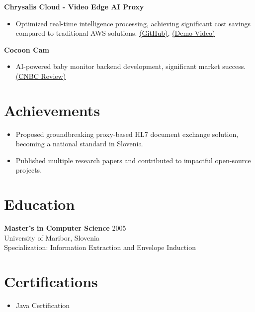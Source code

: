 \documentclass[11pt]{article}
\begin{document}
\textbf{Chrysalis Cloud - Video Edge AI Proxy}
\begin{itemize}
    \item Optimized real-time intelligence processing, achieving significant cost savings compared to traditional AWS solutions. \href{https://github.com/igorrendulic/video-edge-ai-proxy}{(GitHub)}, \href{https://www.youtube.com/watch?v=bWCgTW2Ar5s}{(Demo Video)}
\end{itemize}

\textbf{Cocoon Cam}
\begin{itemize}
    \item AI-powered baby monitor backend development, significant market success. \href{https://www.cnbc.com/2018/06/13/cocoon-cam-review-a-smart-baby-monitor-that-detects-breathing.html}{(CNBC Review)}
\end{itemize}

\section*{Achievements}
\begin{itemize}
    \item Proposed groundbreaking proxy-based HL7 document exchange solution, becoming a national standard in Slovenia.
    \item Published multiple research papers and contributed to impactful open-source projects.
\end{itemize}

\section*{Education}
\textbf{Master's in Computer Science} \hfill 2005\\
University of Maribor, Slovenia\\
Specialization: Information Extraction and Envelope Induction

\section*{Certifications}
\begin{itemize}
    \item Java Certification
\end{itemize}
\end{document}
